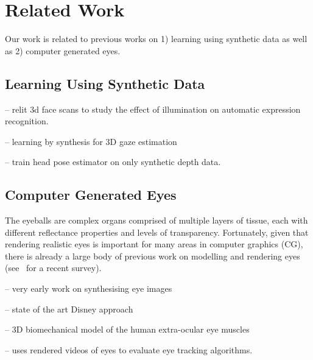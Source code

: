 
\section{Related Work}

Our work is related to previous works on 1) learning using synthetic data as well as 2) computer generated eyes.

\subsection{Learning Using Synthetic Data}

\cite{stratou2011effect} -- relit 3d face scans to study the effect of illumination on automatic expression recognition.

\cite{sugano2014learning} -- learning by synthesis for 3D gaze estimation

\cite{lu2012head}

\cite{fanelli2011real} -- train head pose estimator on only synthetic depth data.

\subsection{Computer Generated Eyes}


The eyeballs are complex organs comprised of multiple layers of tissue, each with different reflectance properties and levels of transparency.
Fortunately, given that rendering realistic eyes is important for many areas in computer graphics (CG), there is already a large body of previous work on modelling and rendering eyes (see~\cite{ruhland2014look} for a recent survey).

\cite{feng1998variance} -- very early work on synthesising eye images

\cite{berard2014highquality} -- state of the art Disney approach


\cite{priamikov14_openeyesim} -- 3D biomechanical model of the human extra-ocular eye muscles

\cite{swirski2014rendering} -- uses rendered videos of eyes to evaluate eye tracking algorithms.




